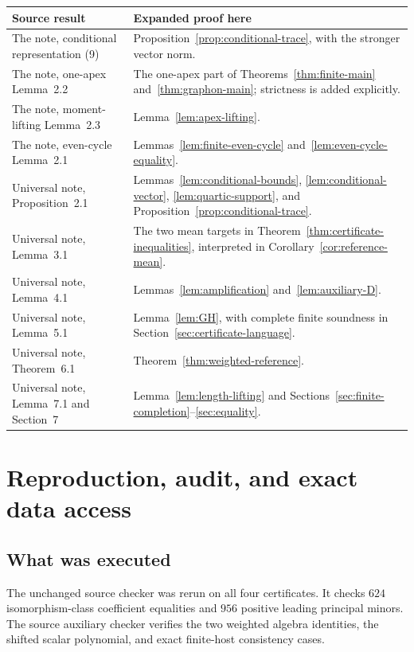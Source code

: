 \begin{center}
\begin{tabular}{@{}p{69mm}p{80mm}@{}}
\toprule
Source result & Expanded proof here\\\midrule
The note, conditional representation (9)
& Proposition~\ref{prop:conditional-trace}, with the stronger vector norm.\\
The note, one-apex Lemma~2.2
& The one-apex part of Theorems~\ref{thm:finite-main} and~\ref{thm:graphon-main};
  strictness is added explicitly.\\
The note, moment-lifting Lemma~2.3
& Lemma~\ref{lem:apex-lifting}.\\
The note, even-cycle Lemma~2.1
& Lemmas~\ref{lem:finite-even-cycle} and~\ref{lem:even-cycle-equality}.\\
Universal note, Proposition~2.1
& Lemmas~\ref{lem:conditional-bounds}, \ref{lem:conditional-vector},
  \ref{lem:quartic-support}, and Proposition~\ref{prop:conditional-trace}.\\
Universal note, Lemma~3.1
& The two mean targets in Theorem~\ref{thm:certificate-inequalities}, interpreted in
  Corollary~\ref{cor:reference-mean}.\\
Universal note, Lemma~4.1
& Lemmas~\ref{lem:amplification} and~\ref{lem:auxiliary-D}.\\
Universal note, Lemma~5.1
& Lemma~\ref{lem:GH}, with complete finite soundness in
  Section~\ref{sec:certificate-language}.\\
Universal note, Theorem~6.1
& Theorem~\ref{thm:weighted-reference}.\\
Universal note, Lemma~7.1 and Section~7
& Lemma~\ref{lem:length-lifting} and Sections~\ref{sec:finite-completion}--\ref{sec:equality}.\\
\bottomrule
\end{tabular}
\end{center}

\section{Reproduction, audit, and exact data access}
\label{sec:reproduction}

\subsection{What was executed}
The unchanged source checker was rerun on all four certificates.  It checks $624$
isomorphism-class coefficient equalities and $956$ positive leading principal minors.
The source auxiliary checker verifies the two weighted algebra identities, the shifted
scalar polynomial, and exact finite-host consistency cases.

